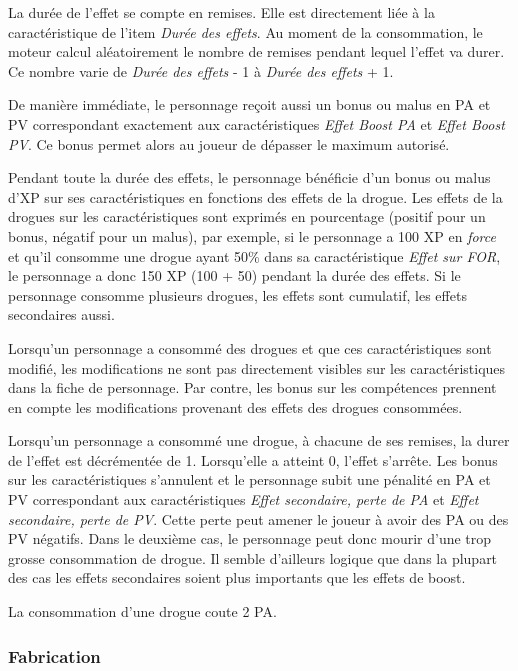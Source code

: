 La durée de l'effet se compte en remises. Elle est directement liée à la caractéristique de l'item \emph{Durée des effets}. Au moment de la consommation, le moteur calcul aléatoirement le nombre de remises pendant lequel l'effet va durer. Ce nombre varie de \emph{Durée des effets} - 1 à \emph{Durée des effets} + 1.

De manière immédiate, le personnage reçoit aussi un bonus ou malus en PA et PV correspondant exactement aux caractéristiques \emph{Effet Boost PA} et \emph{Effet Boost PV}. Ce bonus permet alors au joueur de dépasser le maximum autorisé.

Pendant toute la durée des effets, le personnage bénéficie d'un bonus ou malus d'XP sur ses caractéristiques en fonctions des effets de la drogue. Les effets de la drogues sur les caractéristiques sont exprimés en pourcentage (positif pour un bonus, négatif pour un malus), par exemple, si le personnage a 100 XP en \emph{force} et qu'il consomme une drogue ayant 50\% dans sa caractéristique \emph{Effet sur FOR}, le personnage a donc 150 XP (100 + 50) pendant la durée des effets. Si le personnage consomme plusieurs drogues, les effets sont cumulatif, les effets secondaires aussi.

Lorsqu'un personnage a consommé des drogues et que ces caractéristiques sont modifié, les modifications ne sont pas directement visibles sur les caractéristiques dans la fiche de personnage. Par contre, les bonus sur les compétences prennent en compte les modifications provenant des effets des drogues consommées.

Lorsqu'un personnage a consommé une drogue, à chacune de ses remises, la durer de l'effet est décrémentée de 1. Lorsqu'elle a atteint 0, l'effet s'arrête. Les bonus sur les caractéristiques s'annulent et le personnage subit une pénalité en PA et PV correspondant aux caractéristiques \emph{Effet secondaire, perte de PA} et \emph{Effet secondaire, perte de PV}. Cette perte peut amener le joueur à avoir des PA ou des PV négatifs. Dans le deuxième cas, le personnage peut donc mourir d'une trop grosse consommation de drogue. Il semble d'ailleurs logique que dans la plupart des cas les effets secondaires soient plus importants que les effets de boost.

La consommation d'une drogue coute 2 PA.

\subsubsection{Fabrication}

